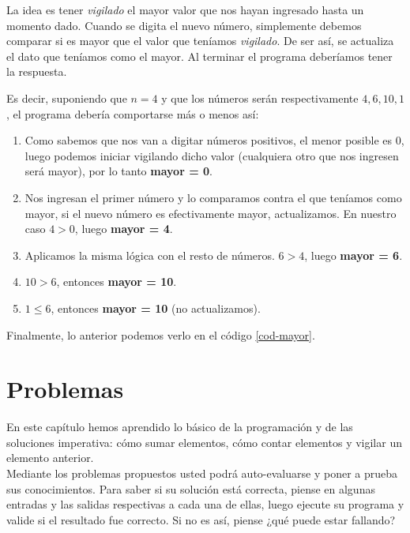 La idea es tener \emph{vigilado} el mayor valor que nos hayan ingresado hasta un momento dado. Cuando se digita el nuevo número, simplemente debemos comparar si es mayor que el valor que teníamos \emph{vigilado}. De ser así, se actualiza el dato que teníamos como el mayor. Al terminar el programa deberíamos tener la respuesta.

Es decir, suponiendo que $n = 4$ y que los números serán respectivamente $4, 6, 10, 1$, el programa debería comportarse más o menos así:

\begin{enumerate}
\item Como sabemos que nos van a digitar números positivos, el menor posible es 0, luego podemos iniciar vigilando dicho valor (cualquiera otro que nos ingresen será mayor), por lo tanto \textbf{mayor = 0}.
\item Nos ingresan el primer número y lo comparamos contra el que teníamos como mayor, si el nuevo número es efectivamente mayor, actualizamos. En nuestro caso $4 > 0$, luego \textbf{mayor = 4}.
\item Aplicamos la misma lógica con el resto de números. $6 > 4$, luego \textbf{mayor = 6}.
\item $10 > 6$, entonces \textbf{mayor = 10}.
\item $1 \leq 6$, entonces \textbf{mayor = 10} (no actualizamos).
\end{enumerate}

Finalmente, lo anterior podemos verlo en el código \ref{cod-mayor}. \\

 

 
\newpage
\section{Problemas}
En este capítulo hemos aprendido lo básico de la programación y de las soluciones imperativa: cómo sumar elementos, cómo contar elementos y vigilar un elemento anterior. \\

Mediante los problemas propuestos usted podrá auto-evaluarse y poner a prueba sus conocimientos. Para saber si su solución está correcta, piense en algunas entradas y las salidas respectivas a cada una de ellas, luego ejecute su programa y valide si el resultado fue correcto. Si no es así, piense ¿qué puede estar fallando?

